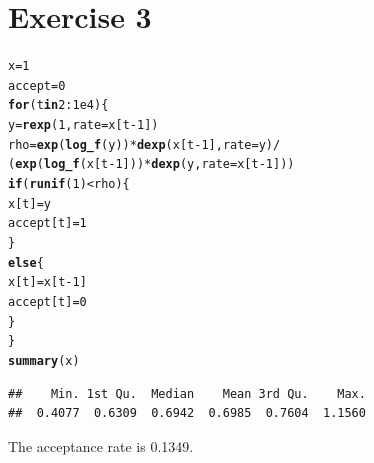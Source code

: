 \documentclass{article}\usepackage[]{graphicx}\usepackage[]{color}
\makeatletter
\newcommand{\hlnum}[1]{\textcolor[rgb]{0.686,0.059,0.569}{#1}}%
\newcommand{\hlopt}[1]{\textcolor[rgb]{0,0,0}{#1}}%
\newcommand{\hlstd}[1]{\textcolor[rgb]{0.345,0.345,0.345}{#1}}%
\newcommand{\hlkwa}[1]{\textcolor[rgb]{0.161,0.373,0.58}{\textbf{#1}}}%
\newcommand{\hlkwb}[1]{\textcolor[rgb]{0.69,0.353,0.396}{#1}}%
\newcommand{\hlkwc}[1]{\textcolor[rgb]{0.333,0.667,0.333}{#1}}%
\newcommand{\hlkwd}[1]{\textcolor[rgb]{0.737,0.353,0.396}{\textbf{#1}}}%
\newenvironment{kframe}{%
 \def\at@end@of@kframe{}%
 \ifinner\ifhmode%
  \def\at@end@of@kframe{\end{minipage}}%
  \begin{minipage}{\columnwidth}%
 \fi\fi%
 \def\FrameCommand##1{\hskip\@totalleftmargin \hskip-\fboxsep
 \colorbox{shadecolor}{##1}\hskip-\fboxsep
     \hskip-\linewidth \hskip-\@totalleftmargin \hskip\columnwidth}%
 \MakeFramed {\advance\hsize-\width
   \@totalleftmargin\z@ \linewidth\hsize
   \@setminipage}}%
 {\par\unskip\endMakeFramed%
 \at@end@of@kframe}
\newenvironment{knitrout}{}{} %
\makeatother
\begin{document}
\section*{Exercise 3}
\begin{knitrout}
\color{fgcolor}\begin{kframe}
\begin{alltt}
\hlstd{x} \hlkwb{=} \hlnum{1}
\hlstd{accept} \hlkwb{=} \hlnum{0}
\hlkwa{for}\hlstd{(t} \hlkwa{in} \hlnum{2}\hlopt{:}\hlnum{1e4}\hlstd{)\{}
  \hlstd{y} \hlkwb{=} \hlkwd{rexp}\hlstd{(}\hlnum{1}\hlstd{,} \hlkwc{rate} \hlstd{= x[t}\hlopt{-}\hlnum{1}\hlstd{])}
  \hlstd{rho} \hlkwb{=} \hlkwd{exp}\hlstd{(}\hlkwd{log_f}\hlstd{(y))}\hlopt{*}\hlkwd{dexp}\hlstd{(x[t}\hlopt{-}\hlnum{1}\hlstd{],} \hlkwc{rate} \hlstd{= y)}\hlopt{/}
    \hlstd{(}\hlkwd{exp}\hlstd{(}\hlkwd{log_f}\hlstd{(x[t}\hlopt{-}\hlnum{1}\hlstd{]))}\hlopt{*}\hlkwd{dexp}\hlstd{(y,} \hlkwc{rate} \hlstd{= x[t}\hlopt{-}\hlnum{1}\hlstd{]))}
    \hlkwa{if}\hlstd{(}\hlkwd{runif}\hlstd{(}\hlnum{1}\hlstd{)}\hlopt{<}\hlstd{rho)\{}
      \hlstd{x[t]} \hlkwb{=} \hlstd{y}
      \hlstd{accept[t]} \hlkwb{=} \hlnum{1}
    \hlstd{\}}
    \hlkwa{else}\hlstd{\{}
      \hlstd{x[t]} \hlkwb{=}\hlstd{x[t}\hlopt{-}\hlnum{1}\hlstd{]}
      \hlstd{accept[t]} \hlkwb{=} \hlnum{0}
  \hlstd{\}}
\hlstd{\}}
\hlkwd{summary}\hlstd{(x)}
\end{alltt}
\begin{verbatim}
##    Min. 1st Qu.  Median    Mean 3rd Qu.    Max. 
##  0.4077  0.6309  0.6942  0.6985  0.7604  1.1560
\end{verbatim}
\end{kframe}
\end{knitrout}
The acceptance rate is 0.1349.
\end{document}
